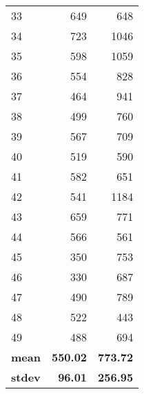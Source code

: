\begin{table}
\begin{center}
\begin{tabular}{lrr}
33 &       649 &    648 \\
34 &       723 &   1046 \\
35 &       598 &   1059 \\
36 &       554 &    828 \\
37 &       464 &    941 \\
38 &       499 &    760 \\
39 &       567 &    709 \\
40 &       519 &    590 \\
41 &       582 &    651 \\
42 &       541 &   1184 \\
43 &       659 &    771 \\
44 &       566 &    561 \\
45 &       350 &    753 \\
46 &       330 &    687 \\
47 &       490 &    789 \\
48 &       522 &    443 \\
49 &       488 &    694 \\ 
\textbf{mean} & \textbf{550.02} & \textbf{773.72} \\
\textbf{stdev} & \textbf{96.01}  & \textbf{256.95} \\
\bottomrule
\end{tabular}
\end{center}
\end{table}

